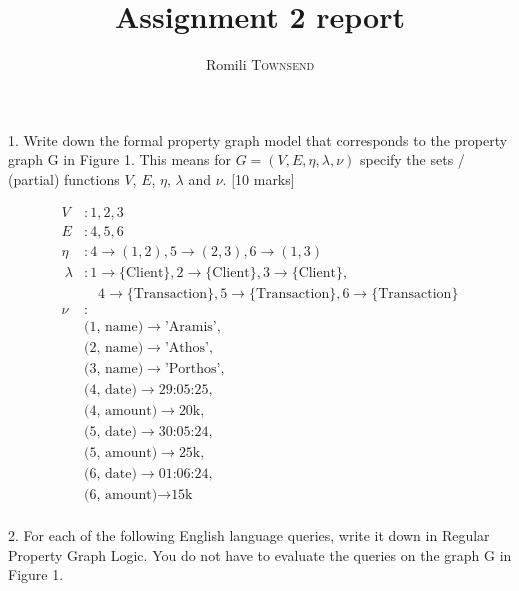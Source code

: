 \documentclass[12pt]{article}
\title{Assignment 2 report}
\author{Romili \textsc{Townsend}}
\begin{document}
\maketitle

1. Write down the formal property graph model that corresponds to the
property graph G in Figure 1. This means for $G = (V, E, \eta, \lambda, \nu)$
specify the sets / (partial) functions $V$, $E$, $\eta$, $\lambda$ and $\nu$.
[10 marks]

\begin{equation*}
\begin{aligned}
    V &: 1, 2, 3 \\
    E &: 4, 5, 6 \\
    \eta &: 4 \to (1,2), 5 \to (2,3), 6 \to (1,3) \\\
    \lambda &: 1 \to \{\text{Client}\}, 2 \to \{\text{Client}\}, 3 \to \{\text{Client}\}, \\
    &\quad 4 \to \{\text{Transaction}\}, 5 \to \{\text{Transaction}\}, 6 \to \{\text{Transaction}\} \\
    \nu &: \\
    &\text{(1, name)} \to \text{'Aramis'}, \\
    &\text{(2, name)} \to \text{'Athos'}, \\
    &\text{(3, name)} \to \text{'Porthos'}, \\
    &\text{(4, date)} \to \text{29:05:25}, \\
    &\text{(4, amount)} \to \text{20k}, \\
    &\text{(5, date)} \to \text{30:05:24}, \\
    &\text{(5, amount)} \to \text{25k}, \\
    &\text{(6, date)} \to \text{01:06:24}, \\
    &\text{(6, amount)} \to \text{15k} \\
\end{aligned}
\end{equation*}

2. For each of the following English language queries, write it down
in Regular Property Graph Logic. You do not have to evaluate the
queries on the graph G in Figure 1.
\end{document}
